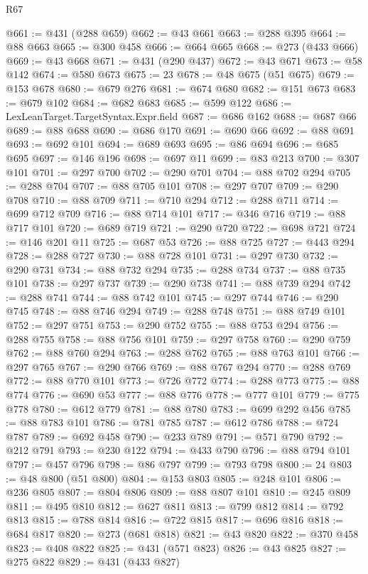 \begin{lexlean}{R67}
\begin{coremodule}
@661 := @431 (@288 @659)
@662 := @43 @661
@663 := @288 @395
@664 := @88 @663
@665 := @300 @458
@666 := @664 @665
@668 := @273 (@433 @666)
@669 := @43 @668
@671 := @431 (@290 @437)
@672 := @43 @671
@673 := @58 @142
@674 := @580 @673
@675 := 23
@678 := @48 @675 (@51 @675)
@679 := @153 @678
@680 := @679 @276
@681 := @674 @680
@682 := @151 @673
@683 := @679 @102
@684 := @682 @683
@685 := @599 @122
@686 := LexLeanTarget.TargetSyntax.Expr.field
@687 := @686 @162
@688 := @687 @66
@689 := @88 @688
@690 := @686 @170
@691 := @690 @66
@692 := @88 @691
@693 := @692 @101
@694 := @689 @693
@695 := @86 @694
@696 := @685 @695
@697 := @146 @196
@698 := @697 @11
@699 := @83 @213
@700 := @307 @101
@701 := @297 @700
@702 := @290 @701
@704 := @88 @702 @294
@705 := @288 @704
@707 := @88 @705 @101
@708 := @297 @707
@709 := @290 @708
@710 := @88 @709
@711 := @710 @294
@712 := @288 @711
@714 := @699 @712 @709
@716 := @88 @714 @101
@717 := @346 @716
@719 := @88 @717 @101
@720 := @689 @719
@721 := @290 @720
@722 := @698 @721
@724 := @146 @201 @11
@725 := @687 @53
@726 := @88 @725
@727 := @443 @294
@728 := @288 @727
@730 := @88 @728 @101
@731 := @297 @730
@732 := @290 @731
@734 := @88 @732 @294
@735 := @288 @734
@737 := @88 @735 @101
@738 := @297 @737
@739 := @290 @738
@741 := @88 @739 @294
@742 := @288 @741
@744 := @88 @742 @101
@745 := @297 @744
@746 := @290 @745
@748 := @88 @746 @294
@749 := @288 @748
@751 := @88 @749 @101
@752 := @297 @751
@753 := @290 @752
@755 := @88 @753 @294
@756 := @288 @755
@758 := @88 @756 @101
@759 := @297 @758
@760 := @290 @759
@762 := @88 @760 @294
@763 := @288 @762
@765 := @88 @763 @101
@766 := @297 @765
@767 := @290 @766
@769 := @88 @767 @294
@770 := @288 @769
@772 := @88 @770 @101
@773 := @726 @772
@774 := @288 @773
@775 := @88 @774
@776 := @690 @53
@777 := @88 @776
@778 := @777 @101
@779 := @775 @778
@780 := @612 @779
@781 := @88 @780
@783 := @699 @292 @456
@785 := @88 @783 @101
@786 := @781 @785
@787 := @612 @786
@788 := @724 @787
@789 := @692 @458
@790 := @233 @789
@791 := @571 @790
@792 := @212 @791
@793 := @230 @122
@794 := @433 @790
@796 := @88 @794 @101
@797 := @457 @796
@798 := @86 @797
@799 := @793 @798
@800 := 24
@803 := @48 @800 (@51 @800)
@804 := @153 @803
@805 := @248 @101
@806 := @236 @805
@807 := @804 @806
@809 := @88 @807 @101
@810 := @245 @809
@811 := @495 @810
@812 := @627 @811
@813 := @799 @812
@814 := @792 @813
@815 := @788 @814
@816 := @722 @815
@817 := @696 @816
@818 := @684 @817
@820 := @273 (@681 @818)
@821 := @43 @820
@822 := @370 @458
@823 := @408 @822
@825 := @431 (@571 @823)
@826 := @43 @825
@827 := @275 @822
@829 := @431 (@433 @827)

\end{coremodule}
\end{lexlean}
